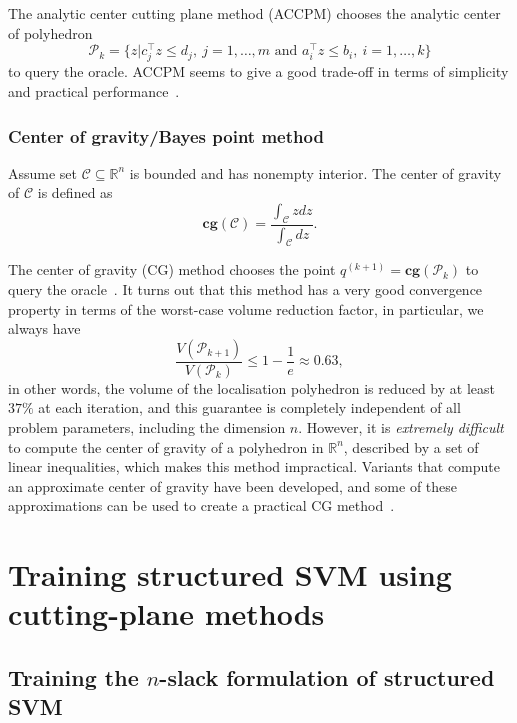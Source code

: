 The analytic center cutting plane method (ACCPM) chooses the analytic center of polyhedron 
\begin{equation*}
\mathcal{P}_k = \{ z | c_j^\top z \le d_j, ~ j=1, \dots, m \text{~and~} a_i^\top z \le b_i, ~ i=1, \dots, k \}
\end{equation*}
to query the oracle.
ACCPM seems to give a good trade-off in terms of simplicity and practical performance~\cite{boydlocalization}.


\subsubsection{Center of gravity/Bayes point method}
\label{sec:cg}

Assume set $\mathcal{C} \subseteq \mathbb{R}^n$ is bounded and has nonempty interior. 
The center of gravity of $\mathcal{C}$ is defined as
\begin{equation}
\textbf{cg}(\mathcal{C}) = \frac{\int_\mathcal{C} z dz}{\int_\mathcal{C} dz}.
\end{equation}

The center of gravity (CG) method chooses the point $q^{(k+1)} = \textbf{cg}(\mathcal{P}_{k})$ to query the oracle~\cite{louche2015cutting}.
It turns out that this method has a very good convergence property in terms of the worst-case volume reduction factor,
in particular, we always have
\begin{equation}
\frac{V(\mathcal{P}_{k+1})}{V(\mathcal{P}_{k})} \le 1 - \frac{1}{e} \approx 0.63,
\end{equation}
in other words, the volume of the localisation polyhedron is reduced by at least $37\%$ at each iteration,
and this guarantee is completely independent of all problem parameters, including the dimension $n$.
However, it is \textit{extremely difficult} to compute the center of gravity of a polyhedron in $\mathbb{R}^n$, described by a set of linear inequalities,
which makes this method impractical.
Variants that compute an approximate center of gravity have been developed, and some of these approximations can be used to create a practical CG method~\cite{boydlocalization}.


\section{Training structured SVM using cutting-plane methods}
\label{sec:ssvm_train}


\subsection{Training the $n$-slack formulation of structured SVM}
\label{sec:nslackssvm}


